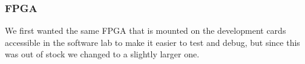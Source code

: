 
\subsubsection{FPGA}

We first wanted the same FPGA that is mounted on the development cards
accessible in the software lab to make it easier to test and debug, but since
this was out of stock we changed to a slightly larger one.

